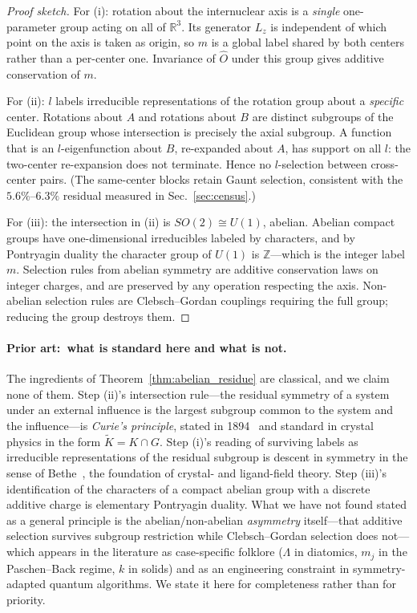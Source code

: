 \documentclass[aps,pra,twocolumn,superscriptaddress,longbibliography]{revtex4-2}
\begin{document}
\begin{proof}[Proof sketch]
For (i): rotation about the internuclear axis is a \emph{single}
one-parameter group acting on all of $\mathbb{R}^3$.  Its generator
$L_z$ is independent of which point on the axis is taken as origin, so
$m$ is a global label shared by both centers rather than a per-center
one.  Invariance of $\hat{O}$ under this group gives additive
conservation of $m$.

For (ii): $l$ labels irreducible representations of the rotation group
about a \emph{specific} center.  Rotations about $A$ and rotations about
$B$ are distinct subgroups of the Euclidean group whose intersection is
precisely the axial subgroup.  A function that is an $l$-eigenfunction
about $B$, re-expanded about $A$, has support on all $l$: the two-center
re-expansion does not terminate.  Hence no $l$-selection between cross-center
pairs.  (The same-center blocks retain Gaunt selection, consistent with
the $5.6\%$--$6.3\%$ residual measured in Sec.~\ref{sec:census}.)

For (iii): the intersection in (ii) is $SO(2) \cong U(1)$, abelian.
Abelian compact groups have one-dimensional irreducibles labeled by
characters, and by Pontryagin duality the character group of $U(1)$ is
$\mathbb{Z}$---which is the integer label $m$.  Selection rules from
abelian symmetry are additive conservation laws on integer charges, and
are preserved by any operation respecting the axis.  Non-abelian
selection rules are Clebsch--Gordan couplings requiring the full group;
reducing the group destroys them.
\end{proof}

\paragraph{Prior art:\ what is standard here and what is not.}
The ingredients of Theorem~\ref{thm:abelian_residue} are classical, and we
claim none of them.  Step (ii)'s intersection rule---the residual symmetry
of a system under an external influence is the largest subgroup common to
the system and the influence---is \emph{Curie's principle},
stated in 1894~\cite{curie1894} and standard in crystal physics in the form
$\tilde{K} = K \cap G$.  Step (i)'s reading of surviving labels as
irreducible representations of the residual subgroup is descent in symmetry
in the sense of Bethe~\cite{bethe1929}, the foundation of crystal- and
ligand-field theory.  Step (iii)'s identification of the characters of a
compact abelian group with a discrete additive charge is elementary
Pontryagin duality.  What we have not found stated as a general principle
is the abelian/non-abelian \emph{asymmetry} itself---that additive
selection survives subgroup restriction while Clebsch--Gordan selection
does not---which appears in the literature as case-specific folklore
($\Lambda$ in diatomics, $m_j$ in the Paschen--Back regime, $k$ in solids)
and as an engineering constraint in symmetry-adapted quantum algorithms.
We state it here for completeness rather than for priority.
\end{document}
